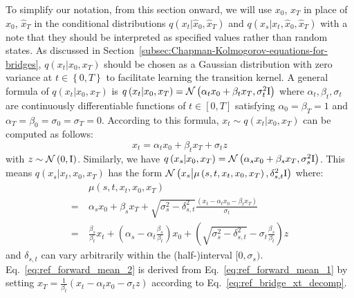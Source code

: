To simplify our notation, from this section onward, we will use $x_{0}$,
$x_{T}$ in place of $\hat{x}_{0}$, $\hat{x}_{T}$ in the conditional
distributions $q\left(x_{t}|\hat{x}_{0},\hat{x}_{T}\right)$ and $q\left(x_{s}|x_{t},\hat{x}_{0},\hat{x}_{T}\right)$
with a note that they should be interpreted as specified values rather
than random states. As discussed in Section~\ref{subsec:Chapman-Kolmogorov-equations-for-bridges},
$q\left(x_{t}|x_{0},x_{T}\right)$ should be chosen as a Gaussian
distribution with zero variance at $t\in\left\{ 0,T\right\} $ to
facilitate learning the transition kernel. A general formula of $q\left(x_{t}|x_{0},x_{T}\right)$
is $q\left(x_{t}|x_{0},x_{T}\right)=\mathcal{N}\left(\alpha_{t}x_{0}+\beta_{t}x_{T},\sigma_{t}^{2}\mathrm{I}\right)$
where $\alpha_{t},\beta_{t},\sigma_{t}$ are continuously differentiable
functions of $t\in\left[0,T\right]$ satisfying $\alpha_{0}=\beta_{T}=1$
and $\alpha_{T}=\beta_{0}=\sigma_{0}=\sigma_{T}=0$. According to
this formula, $x_{t}\sim q\left(x_{t}|x_{0},x_{T}\right)$ can be
computed as follows:
\begin{equation}
x_{t}=\alpha_{t}x_{0}+\beta_{t}x_{T}+\sigma_{t}z\label{eq:ref_bridge_xt_decomp}
\end{equation}
with $z\sim\mathcal{N}\left(0,\mathrm{I}\right)$. Similarly, we have
$q\left(x_{s}|x_{0},x_{T}\right)=\mathcal{N}\left(\alpha_{s}x_{0}+\beta_{s}x_{T},\sigma_{s}^{2}\mathrm{I}\right)$.
This means $q\left(x_{s}|x_{t},x_{0},x_{T}\right)$ has the form $\mathcal{N}\left(x_{s}\big|\mu\left(s,t,x_{t},x_{0},x_{T}\right),\delta_{s,t}^{2}\mathrm{I}\right)$
where:
\begin{align}
 & \mu\left(s,t,x_{t},x_{0},x_{T}\right)\nonumber \\
=\  & \alpha_{s}x_{0}+\beta_{s}x_{T}+\sqrt{\sigma_{s}^{2}-\delta_{s,t}^{2}}\frac{\left(x_{t}-\alpha_{t}x_{0}-\beta_{t}x_{T}\right)}{\sigma_{t}}\label{eq:ref_forward_mean_1}\\
=\  & \frac{\beta_{s}}{\beta_{t}}x_{t}+\left(\alpha_{s}-\alpha_{t}\frac{\beta_{s}}{\beta_{t}}\right)x_{0}+\left(\sqrt{\sigma_{s}^{2}-\delta_{s,t}^{2}}-\sigma_{t}\frac{\beta_{s}}{\beta_{t}}\right)z\label{eq:ref_forward_mean_2}
\end{align}
and $\delta_{s,t}$ can vary arbitrarily within the (half-)interval
$[0,\sigma_{s})$. Eq.~\ref{eq:ref_forward_mean_2} is derived from
Eq.~\ref{eq:ref_forward_mean_1} by setting $x_{T}=\frac{1}{\beta_{t}}\left(x_{t}-\alpha_{t}x_{0}-\sigma_{t}z\right)$
according to Eq.~\ref{eq:ref_bridge_xt_decomp}.

